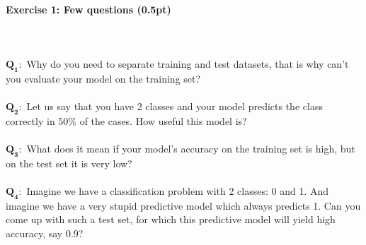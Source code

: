 \documentclass[a4paper,11pt]{article}
\newenvironment{exercise}[3]{\paragraph{Exercise #1: #2 (#3pt)}\ \\}{
\medskip}
\newcommand{\question}[2]{\setlength\parindent{0mm}\ \\$\mathbf{Q_#1:}$ #2\ \\}
\begin{document}
%
%
\begin{exercise}{1}{Few questions}{0.5}
\question{1}{Why do you need to separate training and test datasets, that is why can't you evaluate your model on the training set?}
\question{2}{Let us say that you have 2 classes and your model predicts the class correctly in 50\% of the cases. How useful this model is?}
\question{3}{What does it mean if your model's accuracy on the training set is high, but on the test set it is very low?}
\question{4}{Imagine we have a classification problem with 2 classes: 0 and 1. And imagine we have a very stupid predictive model which always predicts 1. Can you come up with such a test set, for which this predictive model will yield high accuracy, say 0.9?}
\end{exercise}
\end{document}
